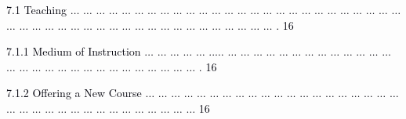 \documentclass[12pt]{article}
\begin{document}
\vspace{\baselineskip}
\begin{adjustwidth}{0.21in}{0.0in}
{\fontsize{7pt}{8.4pt}\selectfont \textcolor[HTML]{00000A}{7.1 Teaching $ \ldots $ $ \ldots $ $ \ldots $ $ \ldots $ $ \ldots $ $ \ldots $ $ \ldots $ $ \ldots $ $ \ldots $ $ \ldots $ $ \ldots $ $ \ldots $ $ \ldots $ $ \ldots $ $ \ldots $ $ \ldots $ $ \ldots $ $ \ldots $ $ \ldots $ $ \ldots $ $ \ldots $ $ \ldots $ $ \ldots $ $ \ldots $ $ \ldots $ $ \ldots $ $ \ldots $ $ \ldots $ $ \ldots $ $ \ldots $ $ \ldots $ $ \ldots $ $ \ldots $ $ \ldots $ $ \ldots $ $ \ldots $ $ \ldots $ $ \ldots $ $ \ldots $ $ \ldots $ $ \ldots $ $ \ldots $ $ \ldots $ $ \ldots $ $ \ldots $ $ \ldots $ $ \ldots $ . 16}\par}\par

\end{adjustwidth}


\vspace{\baselineskip}
\begin{adjustwidth}{0.5in}{0.0in}
{\fontsize{7pt}{8.4pt}\selectfont \textcolor[HTML]{00000A}{7.1.1 Medium of Instruction $ \ldots $ $ \ldots $ $ \ldots $ $ \ldots $ $ \ldots $ ..$ \ldots $ $ \ldots $ $ \ldots $ $ \ldots $ $ \ldots $ $ \ldots $ $ \ldots $ $ \ldots $ $ \ldots $ $ \ldots $ $ \ldots $ $ \ldots $ $ \ldots $ $ \ldots $ $ \ldots $ $ \ldots $ $ \ldots $ $ \ldots $ $ \ldots $ $ \ldots $ $ \ldots $ $ \ldots $ $ \ldots $ $ \ldots $ $ \ldots $ $ \ldots $ $ \ldots $ $ \ldots $ $ \ldots $ . 16}\par}\par

\end{adjustwidth}


\vspace{\baselineskip}
\begin{adjustwidth}{0.5in}{0.0in}
{\fontsize{7pt}{8.4pt}\selectfont \textcolor[HTML]{00000A}{7.1.2 Offering a New Course $ \ldots $ $ \ldots $ $ \ldots $ $ \ldots $ $ \ldots $ $ \ldots $ $ \ldots $ $ \ldots $ $ \ldots $ $ \ldots $ $ \ldots $ $ \ldots $ $ \ldots $ $ \ldots $ $ \ldots $ $ \ldots $ $ \ldots $ $ \ldots $ $ \ldots $ $ \ldots $ $ \ldots $ $ \ldots $ $ \ldots $ $ \ldots $ $ \ldots $ $ \ldots $ $ \ldots $ $ \ldots $ $ \ldots $ $ \ldots $ $ \ldots $ $ \ldots $ $ \ldots $ $ \ldots $ $ \ldots $  16}\par}\par

\end{adjustwidth}
\end{document}
